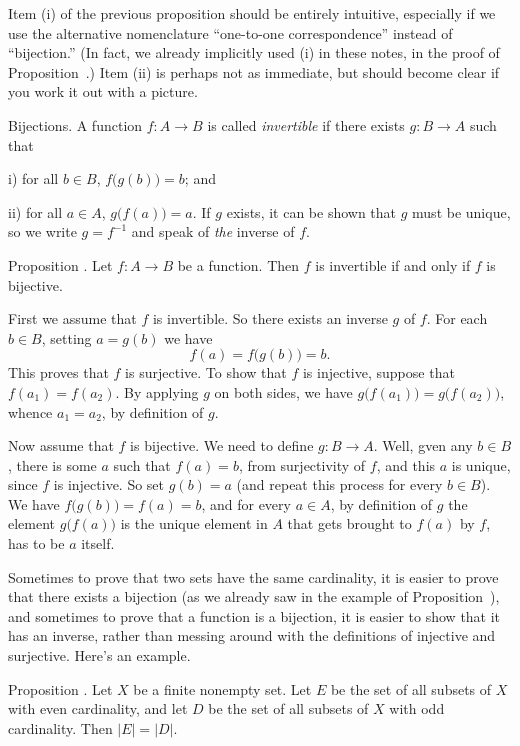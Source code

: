 Item (i) of the previous proposition should be entirely intuitive, especially if we use the alternative
nomenclature ``one-to-one correspondence'' instead of ``bijection.'' (In fact, we already implicitly
used (i) in these notes, in the proof of Proposition~{\propcardpowerset}.) Item (ii) is perhaps not
as immediate, but should become clear if you work it out with a picture.

\medskip\boldlabel Bijections.
A function $f:A\to B$ is called {\it invertible} if there exists $g:B\to A$ such that
\medskip
\item{i)} for all $b\in B$, $f\bigl(g(b)\bigr) = b$; and
\smallskip
\item{ii)} for all $a\in A$, $g\bigl(f(a)\bigr) = a$.
\medskip
If $g$ exists, it can be shown that $g$ must be unique, so we write $g = f^{-1}$ and speak of
{\it the} inverse of $f$.

\proclaim Proposition \advthm. Let $f:A\to B$ be a function. Then $f$ is invertible
if and only if $f$ is bijective.

\proof First we assume that $f$ is invertible. So there exists an inverse $g$ of $f$. For each $b\in B$,
setting $a = g(b)$ we have
$$f(a) = f\bigl(g(b)\bigr) = b.$$
This proves that $f$ is surjective. To show that $f$ is injective, suppose that $f(a_1) = f(a_2)$.
By applying $g$ on both sides, we have $g\bigl(f(a_1)\bigr) = g\bigl(f(a_2)\bigr)$, whence
$a_1 = a_2$, by definition of $g$.

Now assume that $f$ is bijective. We need to define $g:B\to A$. Well, gven any $b\in B$, there is
some $a$ such that $f(a) = b$, from surjectivity of $f$, and this $a$ is unique, since $f$ is
injective. So set $g(b) = a$ (and repeat this process for every $b\in B$). We have
$f\bigl(g(b)\bigr) = f(a) = b$, and for every $a\in A$, by definition of $g$ the
element $g\bigl(f(a)\bigr)$ is the unique element in $A$ that gets brought to $f(a)$ by $f$,
has to be $a$ itself.\slug

Sometimes to prove that two sets have the same cardinality, it is easier to prove that there
exists a bijection (as we already saw in the example of Proposition~{\propcardpowerset}),
and sometimes to prove that a function is a bijection, it is easier to show that it has an inverse,
rather than messing around with the definitions of injective and surjective.
Here's an example.

\edef\propoddevensubsets{\the\thmcount}
\proclaim Proposition \advthm. Let $X$ be a finite nonempty set.
Let $E$ be the set of all subsets of $X$ with
even cardinality, and let $D$ be the set of all subsets of $X$ with odd cardinality.
Then $|E| = |D|$.

